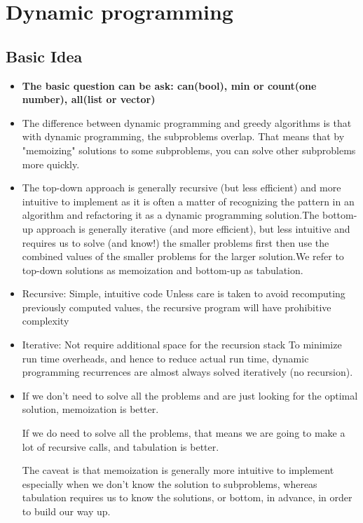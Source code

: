 \documentclass[a4paper,11pt,twoside]{book}
\begin{document}
\section{Dynamic programming}
\subsection{Basic Idea}
\begin{itemize}
	
\item \textbf{The basic question can be ask: can(bool), min or count(one number), all(list or vector)}
	
\item The difference between dynamic programming and greedy algorithms is that with dynamic programming, the subproblems overlap. That means that by "memoizing" solutions to some subproblems, you can solve other subproblems more quickly.   


\item The top-down approach is generally recursive (but less efficient) and more intuitive to implement as it is often a matter of recognizing the pattern in an algorithm and refactoring it as a dynamic programming solution.The bottom-up approach is generally iterative (and more efficient), but less intuitive and requires us to solve (and know!) the smaller problems first then use the combined values of the smaller problems for the larger solution.We refer to top-down solutions as memoization and bottom-up as tabulation.

\item Recursive: Simple, intuitive code
Unless care is taken to avoid recomputing previously computed values, the recursive program will have prohibitive complexity

\item Iterative: Not require additional space for the recursion stack
To minimize run time overheads, and hence to reduce actual run time, dynamic programming recurrences are almost always solved iteratively    (no recursion).

\item If we don’t need to solve all the problems and are just looking for the optimal solution, memoization is better.

If we do need to solve all the problems, that means we are going to make a lot of recursive calls, and tabulation is better.

The caveat is that memoization is generally more intuitive to implement especially when we don’t know the solution to subproblems, whereas tabulation requires us to know the solutions, or bottom, in advance, in order to build our way up.


\end{itemize}
\end{document}

